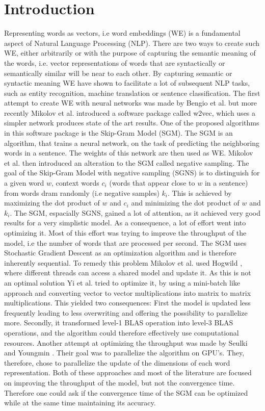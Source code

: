 
\section{Introduction}\label{sec:introduction}

Representing words as vectors, i.e word embeddings (WE) is a fundamental aspect of Natural Language Processing (NLP). There are two ways to create such WE, either arbitrarily or with the purpose of capturing the semantic meaning of the words, i.e. vector representations of words that are syntactically or semantically similar will be near to each other. By capturing semantic or syntactic meaning WE have shown to facilitate a lot of subsequent NLP tasks, such as entity recognition, machine translation or sentence classification. %
The first attempt to create WE with neural networks was made by Bengio et al. \cite{bengio} but more recently Mikolov et al. \cite{mikolov} introduced a software package called w2vec, which uses a simpler network produces state of the art results. One of the proposed algorithms in this software package is the Skip-Gram Model (SGM). The SGM is an algorithm, that trains a neural network, on the task of predicting the neighboring words in a sentence. The weights of this network are then used as WE. Mikolov et al. \cite{mikolov2} then introduced an alteration to the SGM called negative sampling. The goal of the Skip-Gram Model with negative sampling (SGNS) is to distinguish for a given word $w$, context words $c_i$ (words that appear close to $w$ in a sentence) from words dram randomly (i.e negative samples) $k_i$. This is achieved by maximizing the dot product of $w$ and $c_i$ and minimizing the dot product of $w$ and $k_i$. 
The SGM, espacially SGNS, gained a lot of attention, as it achieved very good results for a very simplistic model. As a consequence, a lot of effort went into optimizing it. Most of this effort was trying to improve the throughput of the model, i.e the number of words that are processed per second. The SGM uses Stochastic Gradient Descent as an optimization algorithm and is therefore inherently sequential. To remedy this problem Mikolov et al. used Hogwild \cite{hogwild}, where different threads can access a shared model and update it. As this is not an optimal solution Yi et al. \cite{intel} tried to optimize it, by using a mini-batch like approach and converting vector to vector multiplications into matrix to matrix multiplications. This yielded two consequences: First the model is updated less frequently leading to less overwriting and offering the possibility to parallelize more. Secondly, it transformed level-1 BLAS operation into level-3 BLAS operations, and the algorithm could therefore effectively use computational resources. Another attempt at optimizing the throughput was made by Seulki and Youngmin \cite{gpu}. Their goal was to parallelize the algorithm on GPU's. They, therefore, chose to parallelize the update of the dimensions of each word representation. Both of these approaches and most of the literature are focused on improving the throughput of the model, but not the convergence time.  Therefore one could ask if the convergence time of the SGM can be optimized while at the same time maintaining its accuracy.\\
